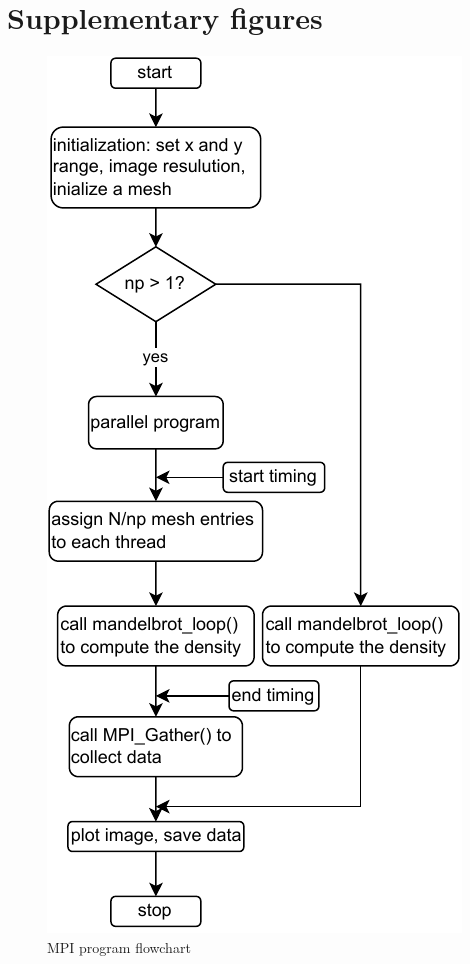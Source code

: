 \documentclass[twoside,12pt]{article}
\theoremstyle{definition}
\theoremstyle{remark}
\begin{document}
\appendix

\newpage
\section{Supplementary figures}
\begin{figure}[h!]
    \centering
    \includegraphics[scale=1.35]{../flowchart_mpi.drawio.pdf}
    \caption{MPI program flowchart}
    \label{fig:mpiflow}
\end{figure}
\end{document}
